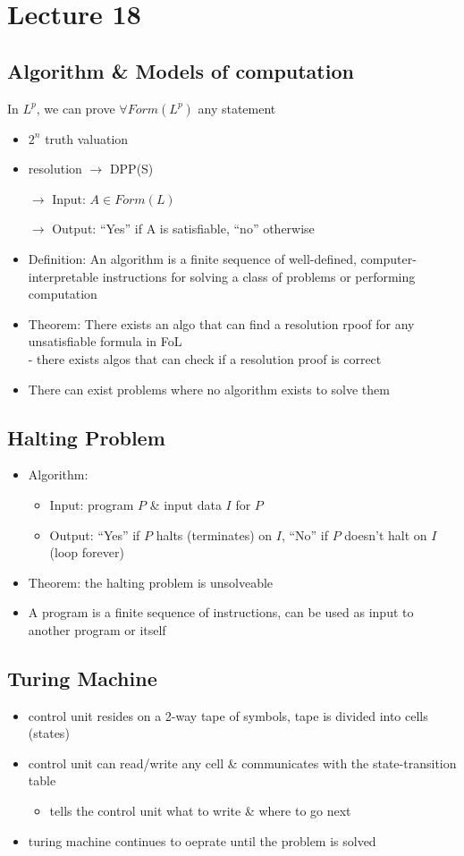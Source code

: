 \documentclass[11pt]{article}
\begin{document}
\section{Lecture 18}
\subsection{Algorithm \& Models of computation}
In $L^p$, we can prove $\forall Form(L^p)$ any statement 
\begin{itemize}
    \item $2^n$ truth valuation 
    \item resolution $\rightarrow$ DPP(S)
    \item[$\rightarrow$] Input: $A\in Form(L)$
    \item[$\rightarrow$] Output: ``Yes'' if A is satisfiable, ``no'' otherwise 
    \item Definition: An algorithm is a finite sequence of well-defined, computer-interpretable instructions for solving a class of problems or performing computation 
    \item Theorem: There exists an algo that can find a resolution rpoof for any unsatisfiable formula in FoL \\
    - there exists algos that can check if a resolution proof is correct 
    \item There can exist problems where no algorithm exists to solve them 
\end{itemize}
\subsection{Halting Problem}
\begin{itemize}
    \item Algorithm:
    \begin{itemize}
        \item Input: program $P$ \& input data $I$ for $P$
        \item Output: ``Yes'' if $P$ halts (terminates) on $I$, ``No'' if $P$ doesn't halt on $I$ (loop forever)
    \end{itemize}
    \item Theorem: the halting problem is unsolveable 
    \item A program is a finite sequence of instructions, can be used as input to another program or itself 
\end{itemize}
\subsection{Turing Machine}
\begin{itemize}
    \item control unit resides on a 2-way tape of symbols, tape is divided into cells (states)
    \item control unit can read/write any cell \& communicates with the state-transition table
    \begin{itemize}
        \item tells the control unit what to write \& where to go next 
    \end{itemize}
    \item turing machine continues to oeprate until the problem is solved 
\end{itemize}
\end{document}
